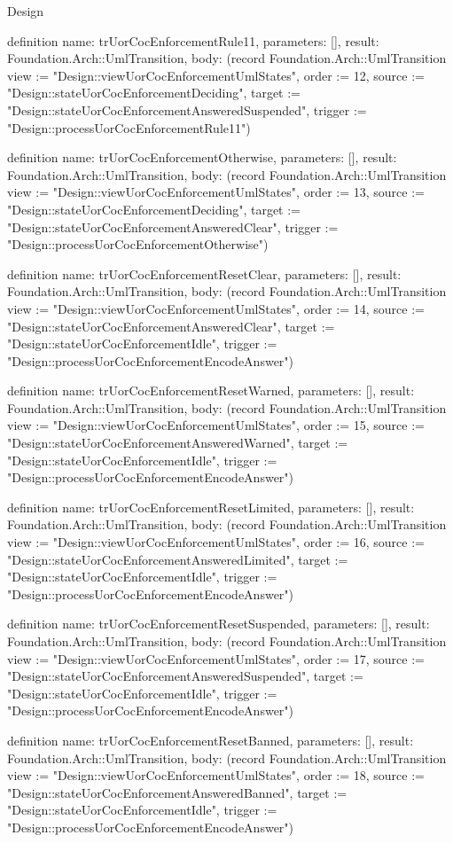 \begin{lexlean}{Design}
\begin{semanticmodule}
definition{
  name: trUorCocEnforcementRule11,
  parameters: [],
  result: Foundation.Arch::UmlTransition,
  body: (record Foundation.Arch::UmlTransition {view := "Design::viewUorCocEnforcementUmlStates", order := 12, source := "Design::stateUorCocEnforcementDeciding", target := "Design::stateUorCocEnforcementAnsweredSuspended", trigger := "Design::processUorCocEnforcementRule11"})
}

definition{
  name: trUorCocEnforcementOtherwise,
  parameters: [],
  result: Foundation.Arch::UmlTransition,
  body: (record Foundation.Arch::UmlTransition {view := "Design::viewUorCocEnforcementUmlStates", order := 13, source := "Design::stateUorCocEnforcementDeciding", target := "Design::stateUorCocEnforcementAnsweredClear", trigger := "Design::processUorCocEnforcementOtherwise"})
}

definition{
  name: trUorCocEnforcementResetClear,
  parameters: [],
  result: Foundation.Arch::UmlTransition,
  body: (record Foundation.Arch::UmlTransition {view := "Design::viewUorCocEnforcementUmlStates", order := 14, source := "Design::stateUorCocEnforcementAnsweredClear", target := "Design::stateUorCocEnforcementIdle", trigger := "Design::processUorCocEnforcementEncodeAnswer"})
}

definition{
  name: trUorCocEnforcementResetWarned,
  parameters: [],
  result: Foundation.Arch::UmlTransition,
  body: (record Foundation.Arch::UmlTransition {view := "Design::viewUorCocEnforcementUmlStates", order := 15, source := "Design::stateUorCocEnforcementAnsweredWarned", target := "Design::stateUorCocEnforcementIdle", trigger := "Design::processUorCocEnforcementEncodeAnswer"})
}

definition{
  name: trUorCocEnforcementResetLimited,
  parameters: [],
  result: Foundation.Arch::UmlTransition,
  body: (record Foundation.Arch::UmlTransition {view := "Design::viewUorCocEnforcementUmlStates", order := 16, source := "Design::stateUorCocEnforcementAnsweredLimited", target := "Design::stateUorCocEnforcementIdle", trigger := "Design::processUorCocEnforcementEncodeAnswer"})
}

definition{
  name: trUorCocEnforcementResetSuspended,
  parameters: [],
  result: Foundation.Arch::UmlTransition,
  body: (record Foundation.Arch::UmlTransition {view := "Design::viewUorCocEnforcementUmlStates", order := 17, source := "Design::stateUorCocEnforcementAnsweredSuspended", target := "Design::stateUorCocEnforcementIdle", trigger := "Design::processUorCocEnforcementEncodeAnswer"})
}

definition{
  name: trUorCocEnforcementResetBanned,
  parameters: [],
  result: Foundation.Arch::UmlTransition,
  body: (record Foundation.Arch::UmlTransition {view := "Design::viewUorCocEnforcementUmlStates", order := 18, source := "Design::stateUorCocEnforcementAnsweredBanned", target := "Design::stateUorCocEnforcementIdle", trigger := "Design::processUorCocEnforcementEncodeAnswer"})
}


\end{semanticmodule}
\end{lexlean}
